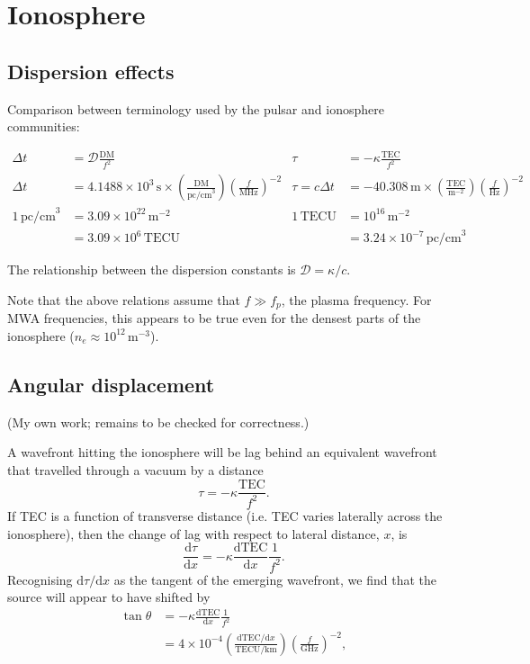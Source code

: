 \documentclass{book}
\newcommand{\deriv}[2]{\frac{\text{d}{#1}}{\text{d}{#2}}}
\begin{document}
\chapter{Ionosphere}

\section{Dispersion effects}

Comparison between terminology used by the pulsar and ionosphere communities:

\begin{align}
    \Delta t &= \mathcal{D} \frac{\text{DM}}{f^2} &
        \tau &= -\kappa \frac{\text{TEC}}{f^2} \\
    \Delta t &= 4.1488\times10^3\,\text{s} \times \left(\frac{\text{DM}}{\text{pc/cm}^3}\right) \left(\frac{f}{\text{MHz}}\right)^{-2} &
        \tau = c\Delta t &= -40.308\,\text{m} \times \left(\frac{\text{TEC}}{\text{m}^{-2}}\right) \left(\frac{f}{\text{Hz}}\right)^{-2} \\
    1\,\text{pc/cm}^3 &= 3.09\times10^{22}\,\text{m}^{-2} &
        1\,\text{TECU} &= 10^{16}\,\text{m}^{-2} \\
    &= 3.09\times10^6\,\text{TECU} &
        &= 3.24\times10^{-7}\,\text{pc/cm}^3
\end{align}

The relationship between the dispersion constants is $\mathcal{D} = \kappa/c$.

Note that the above relations assume that $f \gg f_p$, the plasma frequency.
For MWA frequencies, this appears to be true even for the densest parts of the ionosphere ($n_e \approx 10^{12}\,\text{m}^{-3}$).

\section{Angular displacement}

(My own work; remains to be checked for correctness.)

A wavefront hitting the ionosphere will be lag behind an equivalent wavefront that travelled through a vacuum by a distance
\begin{equation}
    \tau = -\kappa\frac{\text{TEC}}{f^2}.
\end{equation}
If TEC is a function of transverse distance (i.e. TEC varies laterally across the ionosphere), then the change of lag with respect to lateral distance, $x$, is
\begin{equation}
    \deriv{\tau}{x} = -\kappa\deriv{\text{TEC}}{x} \frac{1}{f^2}.
\end{equation}
Recognising $\text{d}\tau/\text{d}x$ as the tangent of the emerging wavefront, we find that the source will appear to have shifted by
\begin{align}
    \tan\theta
        &= -\kappa\deriv{\text{TEC}}{x} \frac{1}{f^2} \\
        &= 4\times10^{-4} \left(\frac{\text{dTEC}/\text{d}x}{\text{TECU/km}}\right) \left(\frac{f}{\text{GHz}}\right)^{-2},
\end{align}
\end{document}
